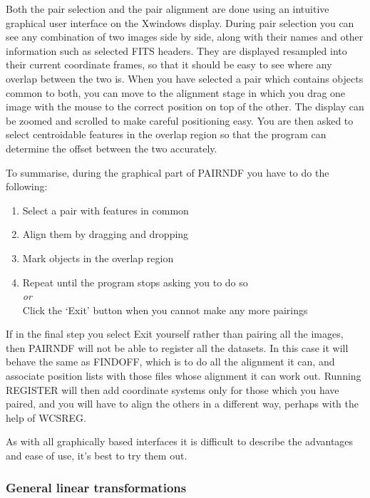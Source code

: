 \documentclass[twoside,11pt]{article}
\newcommand{\htmlref}[2]{#1}
\newcommand{\xlabel}[1]{}
\renewcommand{\_}{\texttt{\symbol{95}}}
\newcommand{\routine}[1]{{\sc #1}}
\newcommand{\xroutine}[1]{\htmlref{{\sc #1}}{#1}}
\begin{document}
Both the pair selection and the pair alignment are done using an
intuitive graphical user interface on the Xwindows display.
During pair selection you can see any combination of
two images side by side, along with their names and other information
such as selected FITS headers.  They are displayed resampled into
their current coordinate frames, so that it should be easy to see
where any overlap between the two is.  When you have selected a pair
which contains objects common to both, you can move to 
the alignment stage
in which you drag one image with the mouse to the correct position 
on top of the other.  
The display can be zoomed and scrolled to make careful positioning easy.
You are then asked to select centroidable features in the 
overlap region so that the program
can determine the offset between the two accurately.

To summarise, during the graphical part of \routine{PAIRNDF} 
you have to do the following:
\begin{enumerate}
\item Select a pair with features in common
\item Align them by dragging and dropping
\item Mark objects in the overlap region
\item Repeat until the program stops asking you to do so \\
      {\em or\/}\\
      Click the `Exit' button when you cannot make any more pairings
\end{enumerate}
If in the final step you select Exit yourself rather than pairing all
the images, then \routine{PAIRNDF} will not be able to register
all the datasets.  In this case it will behave the same as 
\xroutine{FINDOFF}, which is to do all the alignment it can,
and associate position lists with those files whose alignment it
can work out.
Running \routine{REGISTER} will then add coordinate systems only
for those which you have paired, and you will have to align the
others in a different way, perhaps with the help of \xroutine{WCSREG}.

As with all graphically based interfaces it is difficult to 
describe the advantages and ease of use, it's best to try them out.


\subsubsection{\xlabel{usinglineartransforms}General linear transformations}
\end{document}
